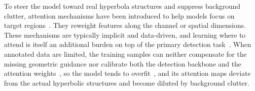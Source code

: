 \documentclass[lettersize,journal]{IEEEtran}
\begin{document}
To steer the model toward real hyperbola structures and suppress background clutter, attention mechanisms have been introduced to help models focus on target regions~\cite{hu2018senet,woo2018cbam,wang2020eca,hou2021coordinate,Fu2024A,hou2025endtoend}. They reweight features along the channel or spatial dimensions.
These mechanisms are typically implicit and data-driven, and learning where to attend is itself an additional burden on top of the primary detection task~\cite{Hsiao2025ResNet-SE-CBAM}. When annotated data are limited, the training samples can neither compensate for the missing geometric guidance nor calibrate both the detection backbone and the attention weights~\cite{XIN2024102307}, so the model tends to overfit~\cite{huang2023survey}, and its attention maps deviate from the actual hyperbolic structures and become diluted by background clutter.
\end{document}

